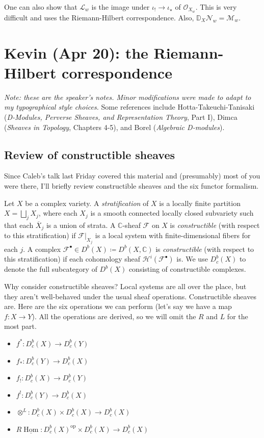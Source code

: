 \documentclass[leqno, openany]{memoir}
\theoremstyle{definition}
\theoremstyle{remark}
\theoremstyle{plain}
\theoremstyle{definition}
\theoremstyle{remark}
\newcommand{\mc}[1]{\mathcal{#1}}
\newcommand{\mr}[1]{\mathrm{#1}}
\newcommand{\ul}[1]{\underline{#1}}
\DeclareMathOperator{\Hom}{Hom}
\begin{document}
One can also show that $\mc{L}_w$ is the image under $\iota_! \to \iota_{\star}$ of $\mc{O}_{X_w}$. This is very difficult and uses the Riemann-Hilbert correspondence. Also, $\mathbb{D}_X \mc{N}_w = \mc{M}_w$.

\chapter{Kevin (Apr 20): the Riemann-Hilbert correspondence}%

\textit{Note: these are the speaker's notes. Minor modifications were made to adapt to my typographical style choices.} Some references include Hotta-Takeuchi-Tanisaki (\textit{D-Modules, Perverse Sheaves, and Representation Theory}, Part I), Dimca (\textit{Sheaves in Topology}, Chapters 4-5), and Borel (\textit{Algebraic D-modules}).

\section{Review of constructible sheaves}
Since Caleb's talk last Friday covered this material and (presumably) most of you were there, I'll briefly review constructible sheaves and the six functor formalism.

Let $X$ be a complex variety. A \textit{stratification} of $X$ is a locally finite partition $X = \bigsqcup_jX_j$, where each $X_j$ is a smooth connected locally closed subvariety such that each $\overline{X}_j$ is a union of strata. A $\mathbb{C}$-sheaf $\mathcal{F}$ on $X$ is \textit{constructible} (with respect to this stratification) if $\mathcal{F}|_{X_j}$ is a local system with finite-dimensional fibers for each $j$. A complex $\mathcal{F}^{\bullet} \in D^b(X) \coloneqq D^b(X,\mathbb{C})$ is \textit{constructible} (with respect to this stratification) if each cohomology sheaf $\mathcal{H}^i(\mathcal{F}^{\bullet})$ is. We use $D_c^b(X)$ to denote the full subcategory of $D^b(X)$ consisting of constructible complexes.

Why consider constructible sheaves? Local systems are all over the place, but they aren't well-behaved under the usual sheaf operations. Constructible sheaves are. Here are the six operations we can perform (let's say we have a map $f: X \to Y$). All the operations are derived, so we will omit the $R$ and $L$ for the most part. \begin{itemize}
\item $f^*: D_c^b(X) \to D_c^b(Y)$

\item $f_*: D_c^b(Y) \to D_c^b(X)$

\item $f_!: D_c^b(X) \to D_c^b(Y)$

\item $f^!: D_c^b(Y) \to D_c^b(X)$

\item $\otimes^L: D_c^b(X) \times D_c^b(X) \to D_c^b(X)$

\item $R\ul{\Hom}: D_c^b(X)^{\mr{op}} \times D_c^b(X) \to D_c^b(X)$

\end{itemize}
\end{document}
